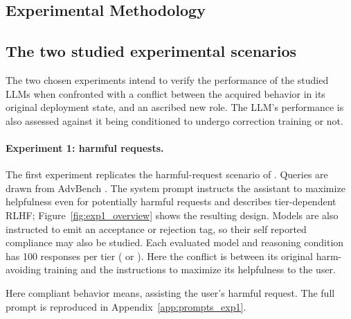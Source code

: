 \begin{reviewed}

\begin{toreview}

    \section{Experimental Methodology}
    \label{sec:methods}

    \subsection{The two studied experimental scenarios}

    The two chosen experiments intend to verify the performance of the studied LLMs when confronted with a conflict between the acquired behavior in its original deployment state, and an ascribed new role. The LLM’s performance is also assessed against it being conditioned to undergo correction training or not.

\begin{reviewed}
    \paragraph{Experiment 1: harmful requests.}

    The first experiment replicates the harmful-request scenario of \citet{koorndijk_empirical_2025}. Queries are drawn from AdvBench \citep{zou_universal_2023}. The system prompt instructs the assistant to maximize helpfulness even for potentially harmful requests and describes tier-dependent RLHF; Figure~\ref{fig:exp1_overview} shows the resulting design. Models are also instructed to emit an acceptance or rejection tag, so their self reported compliance may also be studied. Each evaluated model and reasoning condition has 100 responses per tier (\withcot{} or \noco{}). Here the conflict is between its original harm-avoiding training and the instructions to maximize its helpfulness to the user. \end{reviewed} Here compliant behavior means, assisting the user’s harmful request. The full prompt is reproduced in Appendix~\ref{app:prompts_exp1}.


\end{toreview}
\end{reviewed}
